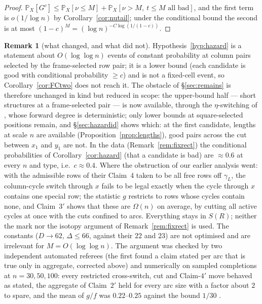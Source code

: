 \documentclass[11pt]{article}
\theoremstyle{definition}
\newtheorem{remark}[theorem]{Remark}
\renewcommand{\Pr}{\mathbb{P}}
\begin{document}
\begin{proof}
$\Pr_X[G^c]\le\Pr_X[\nu\le M]+\Pr_X[\nu>M,\ t\le M\text{ all bad}]$, and the first term is
$o(1/\log n)$ by Corollary~\ref{cor:nutail}; under the conditional bound the second is at
most $(1-c)^M=(\log n)^{-C\log(1/(1-c))}$.
\end{proof}

\begin{remark}[what changed, and what did not]\label{rem:fcchanged}
Hypothesis~\ref{hyp:hazard} is a statement about $O(\log\log n)$ events of constant
probability at column pairs selected by the frame-selected row pair; it is a lower bound
(each candidate is good with conditional probability $\ge c$) and is not a fixed-cell
event, so Corollary~\ref{cor:FCtwo} does not reach it.  The obstacle of
\S\ref{sec:remains} is therefore unchanged in kind but reduced in scope: the upper-bound
half --- short structures at a frame-selected pair --- is now available, through the
$\eta$-switching of \cite{AM26}, whose forward degree is deterministic; only lower bounds
at square-selected positions remain, and \S\ref{sec:hazardid} shows which: at the first
candidate, lengths at scale $n$ are available (Proposition~\ref{prop:lengths}), good
pairs across the cut between $x_1$ and $y_1$ are not.  In the data (Remark~\ref{rem:fixrect}) the
conditional probabilities of Corollary~\ref{cor:hazard} (that a candidate is bad) are
$\approx0.6$ at every $n$ and type, i.e.\ $c\approx0.4$.  Where the obstruction of our earlier analysis went: with the admissible rows of
their Claim~4 taken to be all free rows off $\gamma_L$, the column-cycle switch through
$x$ fails to be legal exactly when the cycle through $x$ contains one special row; the
statistic $g$ restricts to rows whose cycles contain none, and Claim~$3'$ shows that
these are $\Omega(n)$ on average, by cutting all active cycles at once with the cuts
confined to arcs.  Everything stays in $S(R)$; neither the mark nor the isotopy argument
of Remark~\ref{rem:fixrect} is used.  The constants ($D\to62$, $\Delta\le66$, against their
$22$ and $23$) are not optimised and are irrelevant for $M=O(\log\log n)$.  The argument
was checked by two independent automated referees (the first found a claim stated per arc
that is true only in aggregate, corrected above) and numerically on sampled completions
at $n=30,50,100$: every restricted cross-switch, cut and Claim-$4'$ move behaved as
stated, the aggregate of Claim~$2'$ held for every arc size with a factor about $2$ to
spare, and the mean of $g/f$ was $0.22$--$0.25$ against the bound $1/30$ \cite{repo}.
\end{remark}
\end{document}
